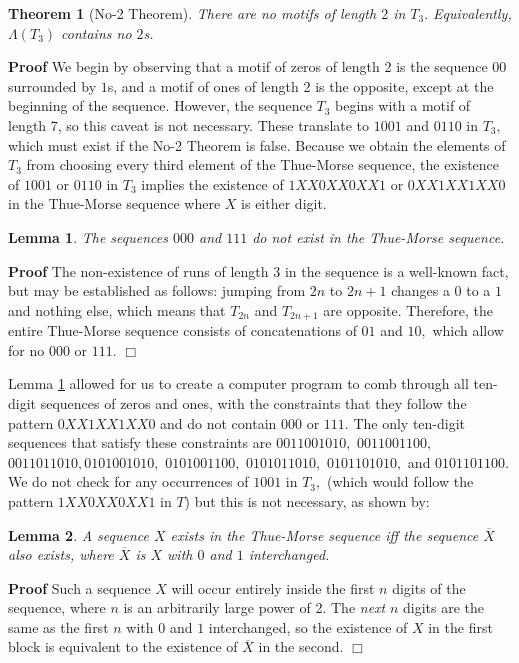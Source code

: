 \documentclass{article}
\newtheorem{theorem}{Theorem}[section]
\newtheorem{lemma}{Lemma}[section]
\begin{document}
\begin{theorem}[No-2 Theorem]
\label{no2}
There are no motifs of length $2$ in $T_3.$ Equivalently, $\Lambda(T_3)$ contains no $2$s.
\end{theorem}

\textbf{Proof}
We begin by observing that a motif of zeros of length 2 is the sequence $00$ surrounded by $1$s, and a motif of ones of length 2 is the opposite, except at the beginning of the sequence. However, the sequence $T_3$ begins with a motif of length 7, so this caveat is not necessary. These translate to $1001$ and $0110$ in $T_3,$ which must exist if the No-2 Theorem is false. Because we obtain the elements of $T_3$ from choosing every third element of the Thue-Morse sequence, the existence of $1001$ or $0110$ in $T_3$ implies the existence of $1XX0XX0XX1$ or $0XX1XX1XX0$ in the Thue-Morse sequence where $X$ is either digit.

\begin{lemma}
\label{triplet}
The sequences $000$ and $111$ do not exist in the Thue-Morse sequence.
\end{lemma}

\textbf{Proof} The non-existence of runs of length 3 in the sequence is a well-known fact, but may be established as follows: jumping from $2n$ to $2n+1$ changes a $0$ to a $1$ and nothing else, which means that $T_{2n}$ and $T_{2n+1}$ are opposite. Therefore, the entire Thue-Morse sequence consists of concatenations of $01$ and $10,$ which allow for no $000$ or $111.$ $\Box$

Lemma \ref{triplet} allowed for us to create a computer program to comb through all ten-digit sequences of zeros and ones, with the constraints that they follow the pattern $0XX1XX1XX0$ and do not contain $000$ or $111.$  The only ten-digit sequences that satisfy these constraints are $0011001010,$ $0011001100,$ $0011011010,$$0101001010,$ $0101001100,$ $0101011010,$ $0101101010,$ and $0101101100.$ We do not check for any occurrences of $1001$ in $T_3,$ (which would follow the pattern $1XX0XX0XX1$ in $T$) but this is not necessary, as shown by:

\begin{lemma}
\label{xiffxbar}
A sequence $X$ exists in the Thue-Morse sequence \emph{iff} the sequence $\overline{X}$ also exists, where $\overline{X}$ is $X$ with $0$ and $1$ interchanged.
\end{lemma}

\textbf{Proof} Such a sequence $X$ will occur entirely inside the first $n$ digits of the sequence, where $n$ is an arbitrarily large power of 2. The \emph{next} $n$ digits are the same as the first $n$ with $0$ and $1$ interchanged, so the existence of $X$ in the first block is equivalent to the existence of $\overline{X}$ in the second. $\Box$
\end{document}
